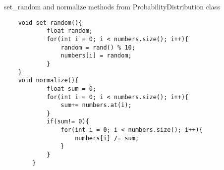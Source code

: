 \documentclass{article}
\begin{document}
\begin{enumerate}[label={[\arabic*]}]
\begin{lstlisting}
\end{lstlisting}

\item set\_random and normalize methods from ProbabilityDistribution class
\begin{lstlisting}
    void set_random(){
            float random;
            for(int i = 0; i < numbers.size(); i++){
                random = rand() % 10;
                numbers[i] = random;
            }
    }
    void normalize(){
            float sum = 0;
            for(int i = 0; i < numbers.size(); i++){
                sum+= numbers.at(i);
            }
            if(sum!= 0){
                for(int i = 0; i < numbers.size(); i++){
                    numbers[i] /= sum;
                }
            }
        }        
\end{lstlisting}

\end{enumerate}
\end{document}

